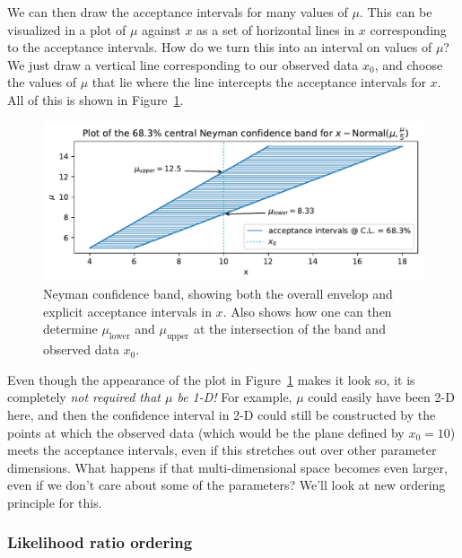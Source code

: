 \documentclass[
  11pt,
  numbers=noendperiod]{book}
\begin{document}
We can then draw the acceptance intervals for many values of \(\mu\).
This can be visualized in a plot of \(\mu\) against \(x\) as a set of
horizontal lines in \(x\) corresponding to the acceptance intervals. How
do we turn this into an interval on values of \(\mu\)? We just draw a
vertical line corresponding to our observed data \(x_0\), and choose the
values of \(\mu\) that lie where the line intercepts the acceptance
intervals for \(x\). All of this is shown in Figure~\ref{fig-neyman}.

\begin{figure}

{\centering \includegraphics{./stat-fundamentals_files/figure-pdf/fig-neyman-output-1.pdf}

}

\caption{\label{fig-neyman}Neyman confidence band, showing both the
overall envelop and explicit acceptance intervals in \(x\). Also shows
how one can then determine \(\mu_{\mathrm{lower}}\) and
\(\mu_{\mathrm{upper}}\) at the intersection of the band and observed
data \(x_0\).}

\end{figure}

Even though the appearance of the plot in Figure~\ref{fig-neyman} makes
it look so, it is completely \emph{not required that \(\mu\) be 1-D!}
For example, \(\mu\) could easily have been 2-D here, and then the
confidence interval in 2-D could still be constructed by the points at
which the observed data (which would be the plane defined by \(x_0=10\))
meets the acceptance intervals, even if this stretches out over other
parameter dimensions. What happens if that multi-dimensional space
becomes even larger, even if we don't care about some of the parameters?
We'll look at new ordering principle for this.

\hypertarget{likelihood-ratio-ordering}{%
\subsubsection*{Likelihood ratio
ordering}\label{likelihood-ratio-ordering}}
\end{document}
